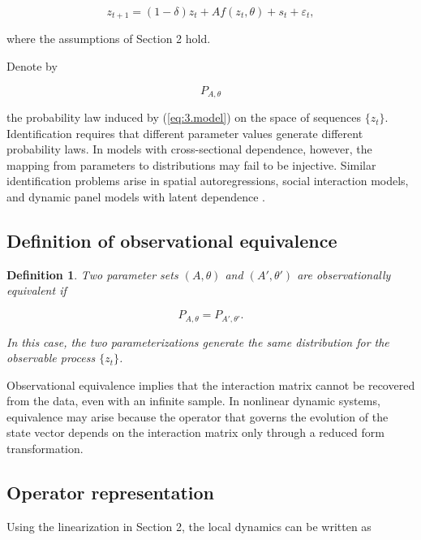 \documentclass[12pt]{article}
\numberwithin{equation}{section}
\newtheorem{definition}[theorem]{Definition}
\begin{document}
\begin{equation}
z_{t+1}
=
(1-\delta) z_t
+
A f(z_t,\theta)
+
s_t
+
\varepsilon_t,
\label{eq:3.model}
\end{equation}

where the assumptions of Section 2 hold.

Denote by

\begin{equation}
P_{A,\theta}
\label{eq:3.distribution}
\end{equation}

the probability law induced by (\ref{eq:3.model}) on the space of sequences
$\{z_t\}$. Identification requires that different parameter values generate
different probability laws. In models with cross-sectional dependence,
however, the mapping from parameters to distributions may fail to be
injective. Similar identification problems arise in spatial autoregressions,
social interaction models, and dynamic panel models with latent dependence
\citep{manski1993identification, anselin1988spatial, bai2009panel,
graham2017econometrics}.

\subsection{Definition of observational equivalence}

\begin{definition}
Two parameter sets $(A,\theta)$ and $(A',\theta')$ are
observationally equivalent if

\begin{equation}
P_{A,\theta}
=
P_{A',\theta'}.
\label{eq:3.obs_equiv}
\end{equation}

In this case, the two parameterizations generate the same distribution for
the observable process $\{z_t\}$.
\end{definition}

Observational equivalence implies that the interaction matrix cannot be
recovered from the data, even with an infinite sample. In nonlinear dynamic
systems, equivalence may arise because the operator that governs the
evolution of the state vector depends on the interaction matrix only through
a reduced form transformation.

\subsection{Operator representation}

Using the linearization in Section 2, the local dynamics can be written as
\end{document}
